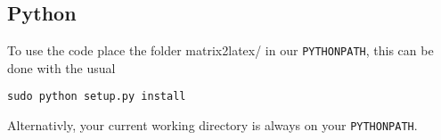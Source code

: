 \subsection{Python}
To use the code place the folder matrix2latex/ in our \verb!PYTHONPATH!, 
this can be done with the usual
\begin{verbatim}
sudo python setup.py install
\end{verbatim}
Alternativly, your current working directory is always on your \verb!PYTHONPATH!.

